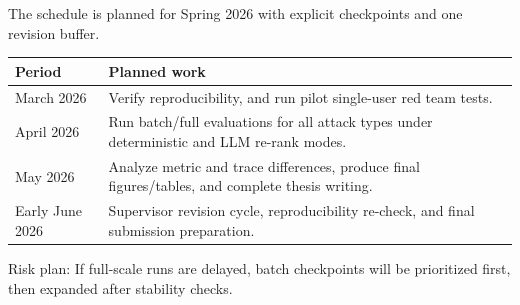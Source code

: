 The schedule is planned for Spring 2026 with explicit checkpoints and one revision buffer.

\begin{center}
\begin{tabular}{p{}p{}}
\toprule
Period & Planned work \\
\midrule
March 2026 & Verify reproducibility, and run pilot single-user red team tests. \\
April 2026 & Run batch/full evaluations for all attack types under deterministic and LLM re-rank modes. \\
May 2026 & Analyze metric and trace differences, produce final figures/tables, and complete thesis writing. \\
Early June 2026 & Supervisor revision cycle, reproducibility re-check, and final submission preparation. \\
\bottomrule
\end{tabular}
\end{center}

Risk plan: If full-scale runs are delayed, batch checkpoints will be prioritized first, then expanded after stability checks.
